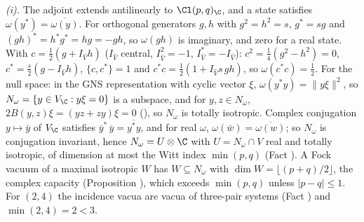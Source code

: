 \emph{(i).} The adjoint extends antilinearly to $\Cl(p,q)_{\C}$, and a state satisfies $\omega(y^{*}) = \overline{\omega(y)}$. For orthogonal generators $g, h$ with $g^{2} = h^{2} = s$, $g^{*} = sg$ and $(gh)^{*} = h^{*}g^{*} = hg = -gh$, so $\omega(gh)$ is imaginary, and zero for a real state. With $c = \tfrac12(g + I_{\hat V}h)$ ($I_{\hat V}$ central, $I_{\hat V}^{2} = -1$, $I_{\hat V}^{*} = -I_{\hat V}$): $c^{2} = \tfrac14(g^{2} - h^{2}) = 0$, $c^{*} = \tfrac{s}{2}(g - I_{\hat V}h)$, $\{c, c^{*}\} = 1$ and $c^{*}c = \tfrac12(1 + I_{\hat V}s\,gh)$, so $\omega(c^{*}c) = \tfrac12$. For the null space: in the GNS representation with cyclic vector $\xi$, $\omega(y^{*}y) = \|y\xi\|^{2}$, so $N_{\omega} = \{y \in V_{\C} : y\xi = 0\}$ is a subspace, and for $y, z \in N_{\omega}$, $2B(y,z)\xi = (yz + zy)\xi = 0$ (), so $N_{\omega}$ is totally isotropic. Complex conjugation $y \mapsto \bar y$ of $V_{\C}$ satisfies $\overline{y}^{*}\,\overline{y} = \overline{y^{*}y}$, and for real $\omega$, $\omega(\bar w) = \overline{\omega(w)}$; so $N_{\omega}$ is conjugation invariant, hence $N_{\omega} = U \otimes \C$ with $U = N_{\omega} \cap V$ real and totally isotropic, of dimension at most the Witt index $\min(p,q)$ (Fact ). A Fock vacuum of a maximal isotropic $W$ has $W \subseteq N_{\omega}$ with $\dim W = \lfloor (p+q)/2 \rfloor$, the complex capacity (Proposition ), which exceeds $\min(p,q)$ unless $|p - q| \le 1$. For $(2,4)$ the incidence vacua are vacua of three-pair systems (Fact ) and $\min(2,4) = 2 < 3$.

